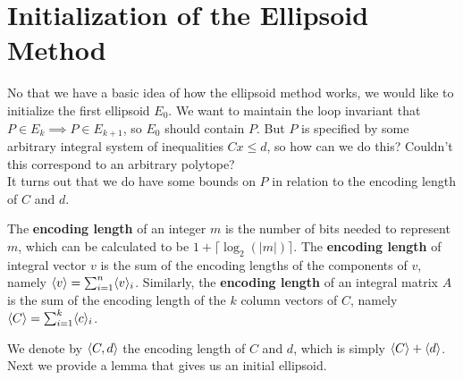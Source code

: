 \section{Initialization of the Ellipsoid Method}
No that we have a basic idea of how the ellipsoid method works, we would like to
initialize the first ellipsoid \(E_0\). We want to maintain the loop invariant
that \(P \in E_k \implies P \in E_{k+1}\), so \(E_0\) should contain \(P\). But
\(P\) is specified by some arbitrary integral system of inequalities \(Cx \leq
d\), so how can we do this? Couldn't this correspond to an arbitrary polytope?\\

It turns out that we do have some bounds on \(P\) in relation to the encoding
length of \(C\) and \(d\). \\

\begin{defbox}
  \begin{definition}
    The \textbf{encoding length} of an integer \(m\) is the number of bits
    needed to represent \(m\), which can be calculated to be \(1 + \lceil
    \log_2(|m|)\rceil\). The \textbf{encoding length} of integral vector \(v\)
    is the sum of the encoding lengths of the components of \(v\), namely
    \(\langle {v} \rangle = \sum_{i=1}^n \langle {v} \rangle_i\). Similarly, the \textbf{encoding
    length} of an integral matrix \(A\) is the sum of the encoding length of the
    \(k\) column vectors of \(C\), namely \(\langle {C} \rangle = \sum_{i=1}^k \langle {c} \rangle_i\).
  \end{definition}
\end{defbox}

We denote by \(\langle {C, d} \rangle\) the encoding length of \(C\) and \(d\), which is
simply \(\langle {C} \rangle + \langle {d} \rangle\). Next we provide a lemma that gives us an
initial ellipsoid.

